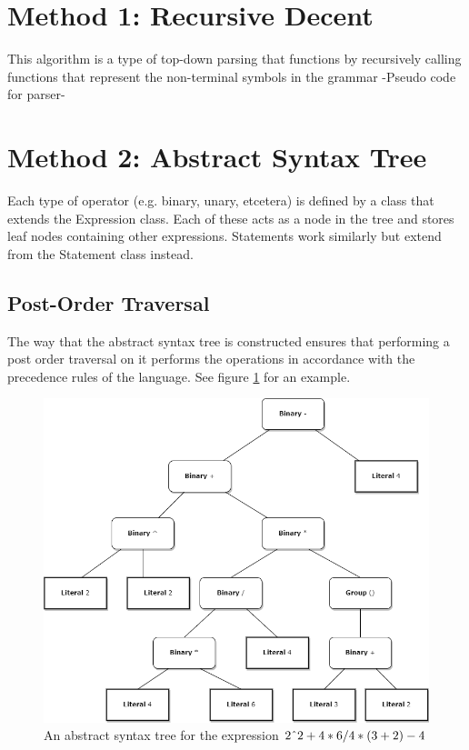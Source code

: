 \documentclass[a4paper, oneside, 11pt]{report}
\begin{document}
\section{Method 1: Recursive Decent}

This algorithm is a type of top-down parsing that functions by recursively calling functions that represent the non-terminal symbols in the grammar
-Pseudo code for parser-

\section{Method 2: Abstract Syntax Tree}

Each type of operator (e.g. binary, unary, etcetera) is defined by a class that extends the Expression class.
Each of these acts as a node in the tree and stores leaf nodes containing other expressions.
Statements work similarly but extend from the Statement class instead.

\subsection{Post-Order Traversal}

The way that the abstract syntax tree is constructed ensures that performing a post order traversal on it performs 
the operations in accordance with the precedence rules of the language. See figure \ref{fig:AST} for an example.

\begin{figure}[htb]
	\includegraphics[width=1.0 \columnwidth]{AST.png}
	\caption{An abstract syntax tree for  the expression $2 \string^ 2 + 4 * 6 / 4 * (3+2) -4$}
	\label{fig:AST}
	\end{figure}
\end{document}
